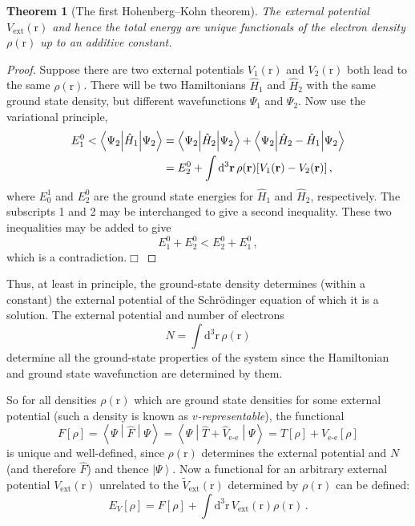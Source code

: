 \documentclass{article}
\theoremstyle{plain}\theoremheaderfont{\normalfont\itshape}\theorembodyfont{\rmfamily}\theoremseparator{.}\newtheorem*{rem}{Remark}\newtheorem*{ex}{Example}\newtheorem*{proof}{Proof}\newtheorem*{altp}{Alternative proof}
\theoremstyle{plain}\theoremheaderfont{\normalfont\bfseries}\theorembodyfont{\rmfamily}\theoremseparator{.}\newtheorem{thm}{Theorem}[section]\newtheorem{lem}[thm]{Lemma}\newtheorem{prop}[thm]{Proposition}\newtheorem*{cor}{Corollary}\newtheorem{defn}[thm]{Definition}\newtheorem{clm}[thm]{Claim}\newtheorem{clminproof}{Claim}
\theoremstyle{break}\theoremheaderfont{\normalfont\itshape}\theorembodyfont{\rmfamily}\theoremseparator{.\medskip}\newtheorem*{proofskip}{Proof}\newtheorem*{exs}{Examples}\newtheorem*{rems}{Remarks}
\theoremstyle{break}\theoremheaderfont{\normalfont\bfseries}\theorembodyfont{\rmfamily}\theoremseparator{.\medskip}\newtheorem{lemskip}[thm]{Lemma}\newtheorem{defnskip}[thm]{Definition}\newtheorem{propskip}[thm]{Proposition}\newtheorem{thmskip}[thm]{Theorem}
\numberwithin{equation}{section}
\newcommand{\qed}{\hfill\ensuremath{\Box}}
\newcommand{\dd}[2][]{\mathrm{d}^{#1} #2\,}
\newcommand{\ket}[1]{\left| #1 \right\rangle}
\newcommand{\expval}[2]{\left\langle #2 \middle| #1 \middle| #2 \right\rangle}
\newcommand{\vb}[1]{\bm{\mathrm{#1}}}
\newcommand{\ext}{_{\text{ext}}}
\newcommand{\ee}{_{\text{e-e}}}
\begin{document}
    \begin{thm}[The first Hohenberg--Kohn theorem]
        The external potential \(V\ext(\vb{r})\) and hence the total energy are unique functionals of the electron density \(\rho(\vb{r})\) up to an additive constant.
    \end{thm}
    \begin{proof}
        Suppose there are two external potentials \(V_{1}(\vb{r})\) and \(V_{2}(\vb{r})\) both lead to the same \(\rho(\vb{r})\). There will be two Hamiltonians \(\hat{H}_1\) and \(\hat{H}_2\) with the same ground state density, but different wavefunctions \(\Psi_1\) and \(\Psi_2\). Now use the variational principle,
        \begin{align}
            E_1^0<\expval{\hat{H}_1}{\Psi_2}&=\expval{\hat{H}_2}{\Psi_2}+\expval{\hat{H}_2-\hat{H}_1}{\Psi_2}\notag\\
            &=E_2^0+\int\dd[3]{\vb{r}}\rho(\vb{r})[V_1(\vb{r})-V_2(\vb{r})]\,,
        \end{align}
        where \(E_0^1\) and \(E_2^0\) are the ground state energies for \(\hat{H}_1\) and \(\hat{H}_2\), respectively. The subscripts 1 and 2 may be interchanged to give a second inequality. These two inequalities may be added to give
        \begin{equation}
            E_1^0+E_2^0<E_2^0+E_1^0\,,
        \end{equation}
        which is a contradiction.\qed
    \end{proof}
    Thus, at least in principle, the ground-state density determines (within a constant) the external potential of the Schr\"{o}dinger equation of which it is a solution. The external potential and number of electrons
    \begin{equation}
        N=\int\dd[3]{\vb{r}}\rho(\vb{r})
    \end{equation}
    determine all the ground-state properties of the system since the Hamiltonian and ground state wavefunction are determined by them.

    So for all densities \(\rho(\vb{r})\) which are ground state densities for some external potential (such a density is known as \textit{\(v\)-representable}), the functional
    \begin{equation}
        F[\rho]=\expval{\hat{F}}{\Psi}=\expval{\hat{T}+\hat{V}\ee}{\Psi}=T[\rho]+V\ee[\rho]
    \end{equation}
    is unique and well-defined, since \(\rho(\vb{r})\) determines the external potential and \(N\) (and therefore \({\hat F}\)) and thence \(\ket{\Psi}\). Now a functional for an arbitrary external potential \(V\ext(\vb{r})\) unrelated to the \(\tilde{V}\ext(\vb{r})\) determined by \(\rho(\vb{r})\) can be defined:
    \begin{equation}
        E_V[\rho]=F[\rho]+\int\dd[3]{\vb{r}}V\ext(\vb{r})\rho(\vb{r})\,.
    \end{equation}
\end{document}
